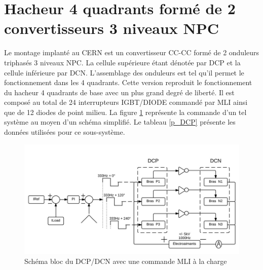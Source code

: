 \documentclass[11pt,letterpaper,final]{report}
\begin{document}
\clearpage
\section{Hacheur 4 quadrants formé de 2 convertisseurs 3 niveaux NPC}
Le montage implanté au CERN est un convertisseur CC-CC formé de 2 onduleurs triphasés 3 niveaux NPC. La cellule supérieure étant dénotée par DCP et la cellule inférieure par DCN. L'assemblage des onduleurs est tel qu'il permet le fonctionnement dans les 4 quadrants. Cette version reproduit le fonctionnement du hacheur 4 quadrants de base avec un plus grand degré de liberté. Il est composé au total de 24 interrupteurs IGBT/DIODE commandé par MLI ainsi que de 12 diodes de point milieu. La figure \ref{DC_DP} représente la commande d'un tel système au moyen d'un schéma simplifié. Le tableau \ref{p_DCP} présente les données utilisées pour ce sous-système.

\begin{figure}[htb]
\centering
\includegraphics[scale=0.5]{Fig/DCPDCN/DCP.jpg}
\caption{Schéma bloc du DCP/DCN avec une commande MLI à la charge}
\label{DC_DP}
\end{figure}
\end{document}
